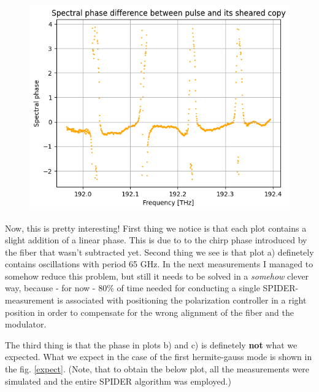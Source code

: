 \documentclass{article}
\begin{document}
\begin{figure}[H]
{\includegraphics[width=\linewidth]{hg_diff_2}%
}
\label{spd}
\end{figure}

Now, this is pretty interesting! First thing we notice is that each plot contains a slight addition of a linear phase. This is due to to the chirp phase introduced by the fiber that wasn't subtracted yet. Second thing we see is that plot a) definetely contains oscillations with period 65 GHz. In the next measurements I managed to somehow reduce this problem, but still it needs to be solved in a \emph{somehow} clever way, because - for now - 80\% of time needed for conducting a single SPIDER-measurement is associated with positioning the polarization controller in a right position in order to compensate for the wrong alignment of the fiber and the modulator.

The third thing is that the phase in plots b) and c) is definetely \textbf{not} what we expected. What we expect in the case of the first hermite-gauss mode is shown in the fig. \ref{expect}. (Note, that to obtain the below plot, all the measurements were simulated and the entire SPIDER algorithm was employed.)
\end{document}
